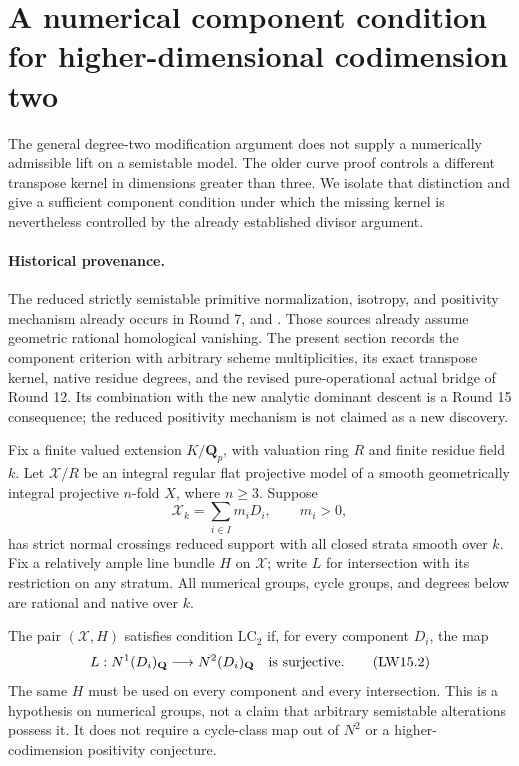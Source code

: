 \section{A numerical component condition for higher-dimensional codimension two}
\label{r15model:section}

The general degree-two modification argument does not supply a
numerically admissible lift on a semistable model.  The older curve
proof controls a different transpose kernel in dimensions greater
than three.  We isolate that distinction and give a sufficient
component condition under which the missing kernel is nevertheless
controlled by the already established divisor argument.

\paragraph{Historical provenance.}
The reduced strictly semistable primitive normalization, isotropy,
and positivity mechanism already occurs in Round 7,
and .
Those sources already assume geometric rational homological
vanishing.  The present section records the component criterion
with arbitrary scheme multiplicities, its exact transpose kernel,
native residue degrees, and the revised pure-operational actual
bridge of Round 12.  Its combination with the new analytic dominant
descent is a Round 15 consequence; the reduced positivity mechanism
is not claimed as a new discovery.

Fix a finite valued extension $K/\mathbf Q_p$, with valuation ring
$R$ and finite residue field $k$.  Let $\mathcal X/R$ be an integral
regular flat projective model of a smooth geometrically integral
projective $n$-fold $X$, where $n\geq3$.  Suppose
\[
 \mathcal X_k=\sum_{i\in I}m_iD_i,\qquad m_i>0,
\tag{LW15.1}\label{r15model:snc}
\]
has strict normal crossings reduced support with all closed strata
smooth over $k$.  Fix a relatively ample line bundle $H$ on
$\mathcal X$; write $L$ for intersection with its restriction on
any stratum.  All numerical groups, cycle groups, and degrees below
are rational and native over $k$.

\begin{definition}
\label{r15model:condition}
The pair $(\mathcal X,H)$ satisfies condition $\mathrm{LC}_2$ if,
for every component $D_i$, the map
\[
 L:N^1(D_i)_{\mathbf Q}\longrightarrow N^2(D_i)_{\mathbf Q}
\quad\hbox{is surjective}.
\tag{LW15.2}\label{r15model:LC2}
\]
The same $H$ must be used on every component and every intersection.
This is a hypothesis on numerical groups, not a claim that arbitrary
semistable alterations possess it.  It does not require a
cycle-class map out of $N^2$ or a higher-codimension positivity
conjecture.
\end{definition}

